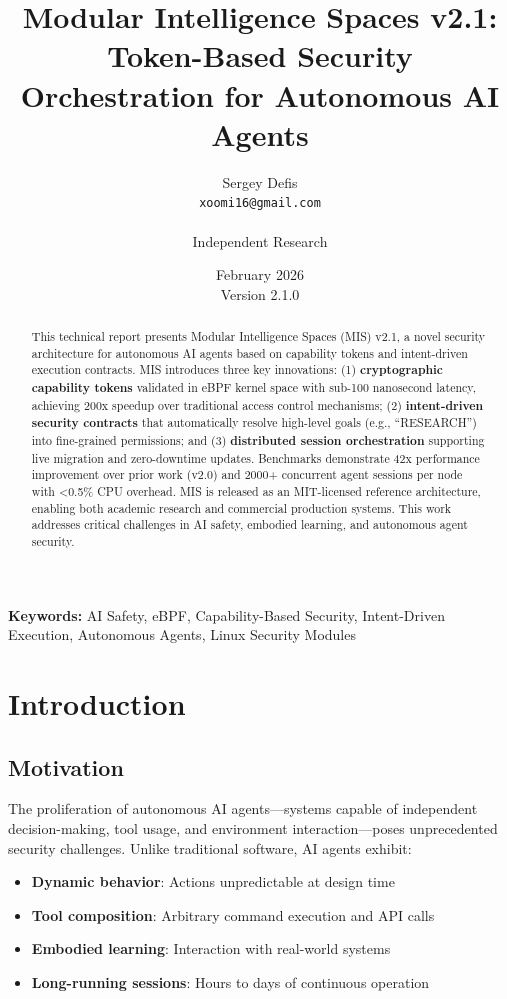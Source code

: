 \documentclass[11pt,a4paper]{article}
\title{\textbf{Modular Intelligence Spaces v2.1:} \\ 
       \Large{Token-Based Security Orchestration for Autonomous AI Agents}}
\author{Sergey Defis\\
        \texttt{xoomi16@gmail.com}\\
        \\
        Independent Research}
\date{February 2026\\
      Version 2.1.0}
\begin{document}
\maketitle

\begin{abstract}
This technical report presents Modular Intelligence Spaces (MIS) v2.1, a novel security architecture for autonomous AI agents based on capability tokens and intent-driven execution contracts. MIS introduces three key innovations: (1) \textbf{cryptographic capability tokens} validated in eBPF kernel space with sub-100 nanosecond latency, achieving 200x speedup over traditional access control mechanisms; (2) \textbf{intent-driven security contracts} that automatically resolve high-level goals (e.g., ``RESEARCH'') into fine-grained permissions; and (3) \textbf{distributed session orchestration} supporting live migration and zero-downtime updates. Benchmarks demonstrate 42x performance improvement over prior work (v2.0) and 2000+ concurrent agent sessions per node with <0.5\% CPU overhead. MIS is released as an MIT-licensed reference architecture, enabling both academic research and commercial production systems. This work addresses critical challenges in AI safety, embodied learning, and autonomous agent security.
\end{abstract}

\vspace{1em}
\noindent\textbf{Keywords:} AI Safety, eBPF, Capability-Based Security, Intent-Driven Execution, Autonomous Agents, Linux Security Modules

\tableofcontents
\newpage

\section{Introduction}

\subsection{Motivation}

The proliferation of autonomous AI agents—systems capable of independent decision-making, tool usage, and environment interaction—poses unprecedented security challenges. Unlike traditional software, AI agents exhibit:

\begin{itemize}
    \item \textbf{Dynamic behavior}: Actions unpredictable at design time
    \item \textbf{Tool composition}: Arbitrary command execution and API calls
    \item \textbf{Embodied learning}: Interaction with real-world systems
    \item \textbf{Long-running sessions}: Hours to days of continuous operation
\end{itemize}
\end{document}

